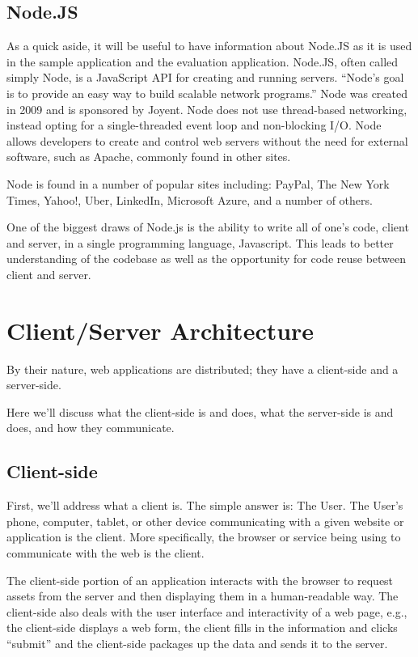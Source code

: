 \documentclass[12pt]{ucthesis}
\begin{document}
\subsection{Node.JS}
As a quick aside, it will be useful to have information about Node.JS as it is used in the sample application and the evaluation application. Node.JS, often called simply Node, is a JavaScript API for creating and running servers. ``Node's goal is to provide an easy way to build scalable network programs.''\cite{Node} Node was created in 2009 and is sponsored by Joyent. Node does not use thread-based networking, instead opting for a single-threaded event loop and non-blocking I/O. Node allows developers to create and control web servers without the need for external software, such as Apache, commonly found in other sites.

Node is found in a number of popular sites including: PayPal, The New York Times, Yahoo!, Uber, LinkedIn, Microsoft Azure, and a number of others\cite{Node}.

One of the biggest draws of Node.js is the ability to write all of one's code, client and server, in a single programming language, Javascript. This leads to better understanding of the codebase as well as the opportunity for code reuse between client and server.

\section{Client/Server Architecture}
By their nature, web applications are distributed; they have a client-side and a server-side.

Here we'll discuss what the client-side is and does, what the server-side is and does, and how they communicate.

\subsection{Client-side}
First, we'll address what a client is. The simple answer is: The User. The User's phone, computer, tablet, or other device communicating with a given website or application is the client. More specifically, the browser or service being using to communicate with the web is the client. 

The client-side portion of an application interacts with the browser to request assets from the server and then displaying them in a human-readable way. The client-side also deals with the user interface and interactivity of a web page, e.g., the client-side displays a web form, the client fills in the information and clicks ``submit'' and the client-side packages up the data and sends it to the server.
\end{document}
